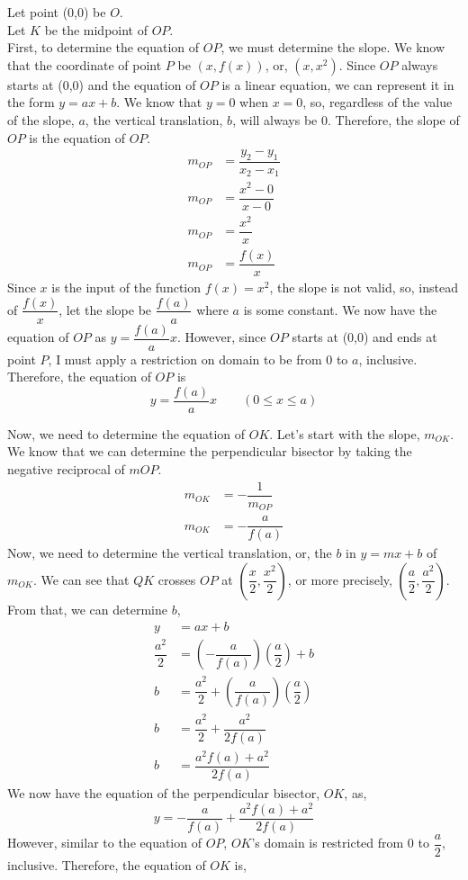 \documentclass[12pt]{book}
\begin{document}
\begin{enumerate}
Let point (0,0) be $O$. \\
Let $K$ be the midpoint of $OP$. \\

First, to determine the equation of $OP$, we must determine the slope. We know that the coordinate of point $P$ be $(x,f(x))$, or, $(x, x^2)$. Since $OP$ always starts at (0,0) and the equation of $OP$ is a linear equation, we can represent it in the form $y = ax + b$. We know that $y=0$ when $x=0$, so, regardless of the value of the slope, $a$, the vertical translation, $b$, will always be 0. Therefore, the slope of $OP$ is the equation of $OP$.
\begin{align}
    m_{OP} &= \dfrac{y_2-y_1}{x_2-x_1} \\
    m_{OP} &= \dfrac{x^2-0}{x-0} \\
    m_{OP} &= \dfrac{x^2}{x} \\
    m_{OP} &= \dfrac{f(x)}{x}
\end{align}
Since $x$ is the input of the function $f(x)=x^2$, the slope is not valid, so, instead of $\dfrac{f(x)}{x}$, let the slope be $\dfrac{f(a)}{a}$ where $a$ is some constant. We now have the equation of $OP$ as $y=\dfrac{f(a)}{a}x$. However, since $OP$ starts at (0,0) and ends at point $P$, I must apply a restriction on domain to be from 0 to $a$, inclusive. Therefore, the equation of $OP$ is
    $$y = \dfrac{f(a)}{a}x \qquad (0 \leq x \leq a)$$
\newpage

Now, we need to determine the equation of $OK$. Let's start with the slope, $m_{OK}$. We know that we can determine the perpendicular bisector by taking the negative reciprocal of $m{OP}$.
\begin{align}
    m_{OK} &= -\dfrac{1}{m_{OP}} \\
    m_{OK} &= -\dfrac{a}{f(a)}
\end{align}
Now, we need to determine the vertical translation, or, the $b$ in $y=mx+b$ of $m_{OK}$. We can see that $QK$ crosses $OP$ at $\left(\dfrac{x}{2}, \dfrac{x^2}{2}\right)$, or more precisely, $\left(\dfrac{a}{2}, \dfrac{a^2}{2}\right)$. From that, we can determine $b$,
\begin{align}
    y &= ax + b \\
    \dfrac{a^2}{2} &= \left(-\dfrac{a}{f(a)}\right)\left(\dfrac{a}{2}\right) + b \\
    b &= \dfrac{a^2}{2} + \left(\dfrac{a}{f(a)}\right)\left(\dfrac{a}{2}\right)\\
    b &= \dfrac{a^2}{2} + \dfrac{a^2}{2f(a)} \\
    b &= \dfrac{a^2f(a) + a^2}{2f(a)}
\end{align}
We now have the equation of the perpendicular bisector, $OK$, as,
$$y = -\dfrac{a}{f(a)} + \dfrac{a^2f(a) + a^2}{2f(a)}$$
However, similar to the equation of $OP$, $OK$'s domain is restricted from 0 to $\dfrac{a}{2}$, inclusive. Therefore, the equation of $OK$ is,


\end{enumerate}
\end{document}
